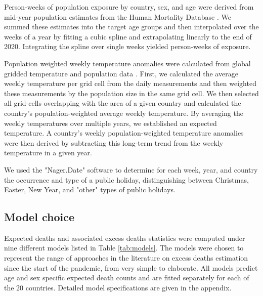 \documentclass[12pt]{article}
\begin{document}

Person-weeks of population exposure by country, sex, and age were derived from mid-year population estimates from the Human Mortality Database \citep{HMD2021}. We summed these estimates into the target age groups and then interpolated over the weeks of a year by fitting a cubic spline and extrapolating linearly to the end of 2020. Integrating the spline over single weeks yielded person-weeks of exposure.


Population weighted weekly temperature anomalies were calculated from global gridded temperature \citep{CPC2021} and population data \citep{CIESIN2018}. First, we calculated the average weekly temperature per grid cell from the daily measurements and then weighted these measurements by the population size in the same grid cell. We then selected all grid-cells overlapping with the area of a given country and calculated the country's population-weighted average weekly temperature. By averaging the weekly temperatures over multiple years, we established an expected temperature. A country's weekly population-weighted temperature anomalies were then derived by subtracting this long-term trend from the weekly temperature in a given year.


We used the "Nager.Date" software \citep{Hager2021} to determine for each week, year, and country the occurrence and type of a public holiday, distinguishing between Christmas, Easter, New Year, and "other" types of public holidays.

\subsection*{Model choice}

Expected deaths and associated excess deaths statistics were computed under nine different models listed in Table \ref{tab:models}. The models were chosen to represent the range of approaches in the literature on excess deaths estimation since the start of the pandemic, from very simple to elaborate. All models predict age and sex specific expected death counts and are fitted separately for each of the 20 countries. Detailed model specifications are given in the appendix.
\end{document}

